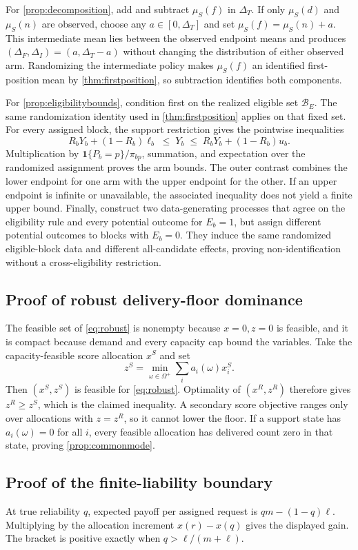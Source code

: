 \documentclass[11pt]{article}
\theoremstyle{definition}
\begin{document}
For \cref{prop:decomposition}, add and subtract $\mu_S(f)$ in $\Delta_T$.
If only $\mu_S(d)$ and $\mu_S(n)$ are observed, choose any
$a\in[0,\Delta_T]$ and set $\mu_S(f)=\mu_S(n)+a$. This intermediate mean lies
between the observed endpoint means and produces
$(\Delta_F,\Delta_I)=(a,\Delta_T-a)$ without changing the distribution of
either observed arm. Randomizing the intermediate policy makes $\mu_S(f)$ an
identified first-position mean by \cref{thm:firstposition}, so subtraction
identifies both components.

For \cref{prop:eligibilitybounds}, condition first on the realized eligible set
$\mathcal B_E$. The same randomization identity used in
\cref{thm:firstposition} applies on that fixed set. For every assigned block,
the support restriction gives the pointwise inequalities
\[
 R_bY_b+(1-R_b)\ell_b
 \;\leq\;Y_b\;\leq\;
 R_bY_b+(1-R_b)u_b.
\]
Multiplication by $\mathbf 1\{P_b=p\}/\pi_{bp}$, summation, and expectation over
the randomized assignment proves the arm bounds. The outer contrast combines
the lower endpoint for one arm with the upper endpoint for the other. If an
upper endpoint is infinite or unavailable, the associated inequality does not
yield a finite upper bound. Finally, construct two data-generating processes
that agree on the eligibility rule and every potential outcome for $E_b=1$, but
assign different potential outcomes to blocks with $E_b=0$. They induce the
same randomized eligible-block data and different all-candidate effects,
proving non-identification without a cross-eligibility restriction.

\subsection{Proof of robust delivery-floor dominance}
The feasible set of \cref{eq:robust} is nonempty because $x=0,z=0$ is feasible,
and it is compact because demand and every capacity cap bound the variables.
Take the capacity-feasible score allocation $x^S$ and set
\[
 z^S=\min_{\omega\in\Omega^+}\sum_i a_i(\omega)x_i^S.
\]
Then $(x^S,z^S)$ is feasible for \cref{eq:robust}. Optimality of $(x^R,z^R)$
therefore gives $z^R\geq z^S$, which is the claimed inequality. A secondary
score objective ranges only over allocations with $z=z^R$, so it cannot lower
the floor. If a support state has $a_i(\omega)=0$ for all $i$, every feasible
allocation has delivered count zero in that state, proving
\cref{prop:commonmode}.

\subsection{Proof of the finite-liability boundary}
At true reliability $q$, expected payoff per assigned request is
$qm-(1-q)\ell$. Multiplying by the allocation increment
$x(r)-x(q)$ gives the displayed gain. The bracket is positive exactly when
$q>\ell/(m+\ell)$.
\end{document}
